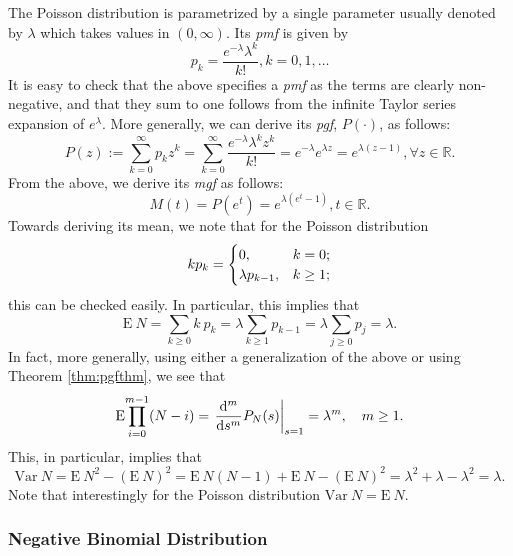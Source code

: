 \documentclass[]{book}
\theoremstyle{definition}
\theoremstyle{definition}
\theoremstyle{definition}
\theoremstyle{remark}
\begin{document}
The Poisson distribution is parametrized by a single parameter usually
denoted by \(\lambda\) which takes values in \((0,\infty)\). Its
\emph{pmf} is given by \[
p_k = \frac{e^{-\lambda}\lambda^k}{k!}, k=0,1,\ldots
\] It is easy to check that the above specifies a \emph{pmf} as the
terms are clearly non-negative, and that they sum to one follows from
the infinite Taylor series expansion of \(e^\lambda\). More generally,
we can derive its \emph{pgf}, \(P(\cdot)\), as follows: \[
P(z):= \sum_{k=0}^\infty p_k z^k = \sum_{k=0}^\infty  \frac{e^{-\lambda}\lambda^kz^k}{k!} = e^{-\lambda} e^{\lambda z}
= e^{\lambda(z-1)}, \forall z\in\mathbb{R}.
\] From the above, we derive its \emph{mgf} as follows: \[
M(t)=P(e^t)=e^{\lambda(e^t-1)}, t\in \mathbb{R}.
\] Towards deriving its mean, we note that for the Poisson distribution
\[
kp_k=\begin{cases}
0,  &k=0;\cr
\lambda p_{k-1}, &k\geq1;
\end{cases}
\] this can be checked easily. In particular, this implies that \[
\mathrm{E}~{N}=\sum_{k\geq 0} k~p_k =\lambda\sum_{k\geq 1} p_{k-1} = \lambda\sum_{j\geq 0} p_{j} =\lambda.
\] In fact, more generally, using either a generalization of the above
or using Theorem \ref{thm:pgfthm}, we see that \[
\mathrm{E}{\prod\limits_{i=0}^{m-1} (N-i)}=\left.\frac{{\rm d}^m}{{\rm d}s^m} P_N(s)\right\vert_{s=1}=\lambda^m, \quad m\geq 1.
\] This, in particular, implies that \[
\mathrm{Var}~{N}=\mathrm{E}~{N^2}-(\mathrm{E}~{N})^2 = \mathrm{E}~{N(N-1)}+\mathrm{E}~{N}-(\mathrm{E}~{N})^2=\lambda^2+\lambda-\lambda^2=\lambda.
\] Note that interestingly for the Poisson distribution
\(\mathrm{Var}~{N}=\mathrm{E}~{N}\).

\subsubsection{Negative Binomial
Distribution}\label{S:negative-binomial-distribution}
\end{document}
